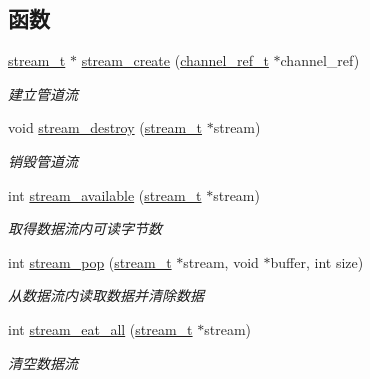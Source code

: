 \subsection*{函数}
\begin{DoxyCompactItemize}
\item 
\hyperlink{a00050_a261dba04f46f5c59a68a05f69f5a65a8_a261dba04f46f5c59a68a05f69f5a65a8}{stream\+\_\+t} $\ast$ \hyperlink{a00090_a3d96722aed377b124baa5a38a4b3fa54_a3d96722aed377b124baa5a38a4b3fa54}{stream\+\_\+create} (\hyperlink{a00050_a151271c9d188ef28d4d24bb81dcc1263_a151271c9d188ef28d4d24bb81dcc1263}{channel\+\_\+ref\+\_\+t} $\ast$channel\+\_\+ref)
\begin{DoxyCompactList}\small\item\em 建立管道流 \end{DoxyCompactList}\item 
void \hyperlink{a00090_ac57e177168fe8e441793c4345f5745c3_ac57e177168fe8e441793c4345f5745c3}{stream\+\_\+destroy} (\hyperlink{a00050_a261dba04f46f5c59a68a05f69f5a65a8_a261dba04f46f5c59a68a05f69f5a65a8}{stream\+\_\+t} $\ast$stream)
\begin{DoxyCompactList}\small\item\em 销毁管道流 \end{DoxyCompactList}\item 
int \hyperlink{a00107_ga6e109b2dc520782567dc1891af3b945e_ga6e109b2dc520782567dc1891af3b945e}{stream\+\_\+available} (\hyperlink{a00050_a261dba04f46f5c59a68a05f69f5a65a8_a261dba04f46f5c59a68a05f69f5a65a8}{stream\+\_\+t} $\ast$stream)
\begin{DoxyCompactList}\small\item\em 取得数据流内可读字节数 \end{DoxyCompactList}\item 
int \hyperlink{a00107_ga6e01758abf49f8b08cd457f1cb48a954_ga6e01758abf49f8b08cd457f1cb48a954}{stream\+\_\+pop} (\hyperlink{a00050_a261dba04f46f5c59a68a05f69f5a65a8_a261dba04f46f5c59a68a05f69f5a65a8}{stream\+\_\+t} $\ast$stream, void $\ast$buffer, int size)
\begin{DoxyCompactList}\small\item\em 从数据流内读取数据并清除数据 \end{DoxyCompactList}\item 
int \hyperlink{a00107_gaef7f4ca2c201faf5d82a1dad4c8d7814_gaef7f4ca2c201faf5d82a1dad4c8d7814}{stream\+\_\+eat\+\_\+all} (\hyperlink{a00050_a261dba04f46f5c59a68a05f69f5a65a8_a261dba04f46f5c59a68a05f69f5a65a8}{stream\+\_\+t} $\ast$stream)
\begin{DoxyCompactList}\small\item\em 清空数据流 \end{DoxyCompactList}\item 

\end{DoxyCompactItemize}
